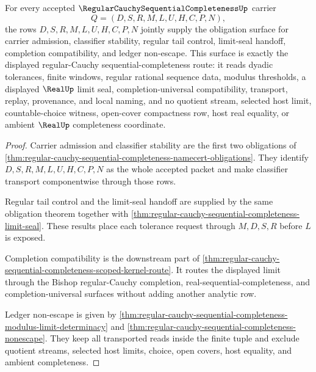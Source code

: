 \begin{theorem}
\label{thm:regular-cauchy-sequential-completeness-obligation-surface}
For every accepted $\RegularCauchySequentialCompletenessUp$ carrier
$$
Q=(D,S,R,M,L,U,H,C,P,N),
$$
the rows $D,S,R,M,L,U,H,C,P,N$ jointly supply the obligation surface for carrier admission, classifier stability, regular tail control, limit-seal handoff, completion compatibility, and ledger non-escape. This surface is exactly the displayed regular-Cauchy sequential-completeness route: it reads dyadic tolerances, finite windows, regular rational sequence data, modulus thresholds, a displayed $\RealUp$ limit seal, completion-universal compatibility, transport, replay, provenance, and local naming, and no quotient stream, selected host limit, countable-choice witness, open-cover compactness row, host real equality, or ambient $\RealUp$ completeness coordinate.
\end{theorem}
\begin{proof}
Carrier admission and classifier stability are the first two obligations of \autoref{thm:regular-cauchy-sequential-completeness-namecert-obligations}. They identify $D,S,R,M,L,U,H,C,P,N$ as the whole accepted packet and make classifier transport componentwise through those rows.

Regular tail control and the limit-seal handoff are supplied by the same obligation theorem together with \autoref{thm:regular-cauchy-sequential-completeness-limit-seal}. These results place each tolerance request through $M,D,S,R$ before $L$ is exposed.

Completion compatibility is the downstream part of \autoref{thm:regular-cauchy-sequential-completeness-scoped-kernel-route}. It routes the displayed limit through the Bishop regular-Cauchy completion, real-sequential-completeness, and completion-universal surfaces without adding another analytic row.

Ledger non-escape is given by \autoref{thm:regular-cauchy-sequential-completeness-modulus-limit-determinacy} and \autoref{thm:regular-cauchy-sequential-completeness-nonescape}. They keep all transported reads inside the finite tuple and exclude quotient streams, selected host limits, choice, open covers, host equality, and ambient completeness.
\end{proof}

